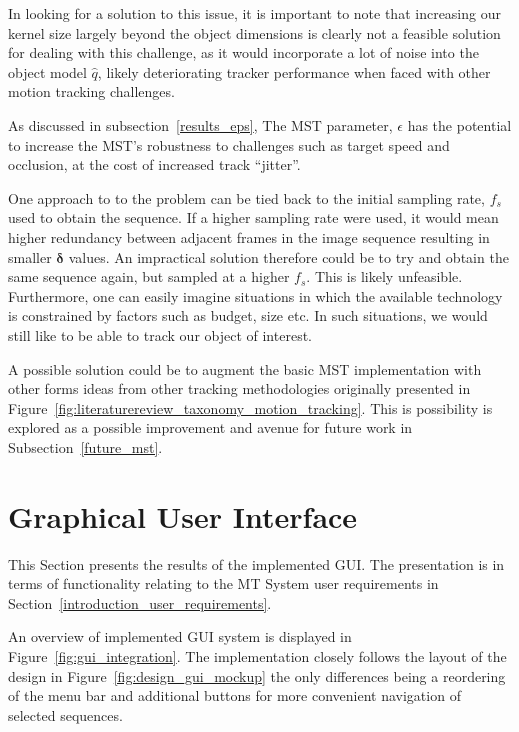 In looking for a solution to this issue, it is important to note that increasing
our kernel size largely beyond the object dimensions is clearly not a feasible solution
for dealing with this challenge, as it would incorporate a lot of noise into the
object model $\hat{q}$, likely deteriorating tracker performance when faced with
other motion tracking challenges.

As discussed in subsection~\ref{results_eps}, The MST parameter, $\epsilon$ has
the potential to increase the MST's robustness to challenges such as target
speed and occlusion, at the cost of increased track ``jitter''. 

One approach to to the problem can be tied back to the initial sampling rate,
$f_s$ used to obtain the sequence. If a higher sampling rate were used, it would
mean higher redundancy between adjacent frames in the image sequence resulting
in smaller $\mathbf{\delta}$ values. An impractical solution therefore could be to try
and obtain the same sequence again, but sampled at a higher $f_s$.
This is likely unfeasible. Furthermore, one can easily imagine situations in which the
available technology is constrained by factors such as budget, size etc. In such
situations, we would still like to be able to track our object of interest. 

A possible solution could be to augment the basic MST implementation with other
forms ideas from other tracking methodologies originally
presented in Figure~\ref{fig:literaturereview_taxonomy_motion_tracking}. This is
possibility is explored as a possible improvement and avenue for future work in
Subsection~\ref{future_mst}. 


\section{Graphical User Interface}\label{results_gui}
This Section presents the results of the implemented GUI. The presentation is in
terms of functionality relating to the MT System user requirements in
Section~\ref{introduction_user_requirements}.

An overview of implemented GUI system is displayed in
Figure~\ref{fig:gui_integration}. The implementation closely follows the layout of the design in
Figure~\ref{fig:design_gui_mockup} the only differences being a reordering of
the menu bar and additional buttons for more convenient navigation of selected
sequences.

